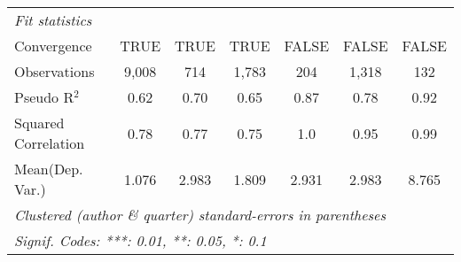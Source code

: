 \begin{tabular}{lcccccc}
   \midrule
   \emph{Fit statistics}\\
   Convergence                                                &TRUE           & TRUE          & TRUE          & FALSE   & FALSE         & FALSE\\  
   Observations                                               & 9,008         & 714           & 1,783         & 204     & 1,318         & 132\\  
   Pseudo R$^2$                                               & 0.62          & 0.70          & 0.65          & 0.87    & 0.78          & 0.92\\  
   Squared Correlation                                        & 0.78          & 0.77          & 0.75          & 1.0     & 0.95          & 0.99\\  
Mean(Dep. Var.) & 1.076 & 2.983 & 1.809 & 2.931 & 2.983 & 8.765 \\
   \midrule \midrule
   \multicolumn{7}{l}{\emph{Clustered (author \& quarter) standard-errors in parentheses}}\\
   \multicolumn{7}{l}{\emph{Signif. Codes: ***: 0.01, **: 0.05, *: 0.1}}\\
\end{tabular}
\par\endgroup
